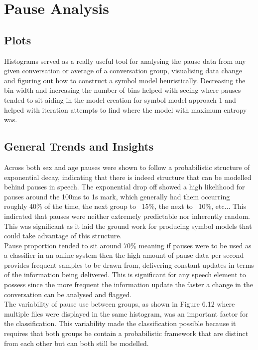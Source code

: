 \section{Pause Analysis}
\subsection{Plots}
Histograms served as a really useful tool for analysing the pause data from any given conversation or average of a conversation group, visualising data change and figuring out how to construct a symbol model heuristically. Decreasing the bin width and increasing the number of bins helped with seeing where pauses tended to sit aiding in the model creation for symbol model approach 1 and helped with iteration attempts to find where the model with maximum entropy was.\\ 

\subsection{General Trends and Insights}
Across both sex and age pauses were shown to follow a probabilistic structure of exponential decay, indicating that there is indeed structure that can be modelled behind pauses in speech. The exponential drop off showed a high likelihood for pauses around the 100ms to 1s mark, which generally had them occurring roughly 40\% of the time, the next group to ~15\%, the next to ~10\%, etc... This indicated that pauses were neither extremely predictable nor inherently random. This was significant as it laid the ground work for producing symbol models that could take advantage of this structure. \\

Pause proportion tended to sit around 70\% meaning if pauses were to be used as a classifier in an online system then the high amount of pause data per second provides frequent samples to be drawn from, delivering constant updates in terms of the information being delivered. This is significant for any speech element to possess since the more frequent the information update the faster a change in the conversation can be analysed and flagged. \\

The variability of pause use between groups, as shown in Figure 6.12 where multiple files were displayed in the same histogram, was an important factor for the classification. This variability made the classification possible because it requires that both groups be contain a probabilistic framework that are distinct from each other but can both still be modelled. \\

